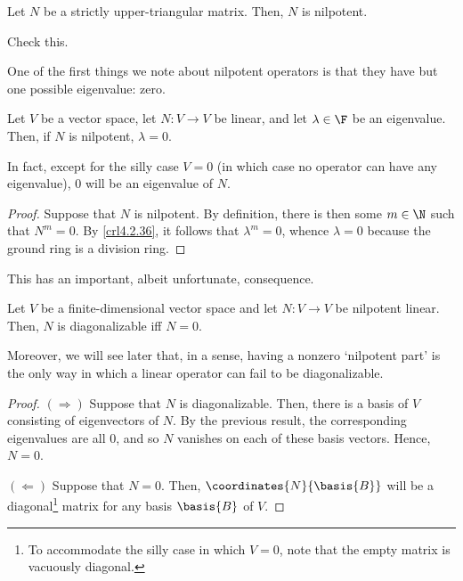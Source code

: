 \begin{exm}{}{}
	Let $N$ be a strictly upper-triangular matrix.  Then, $N$ is nilpotent.
	\begin{exr}[breakable=false]{}{}
		Check this.
	\end{exr}
\end{exm}

One of the first things we note about nilpotent operators is that they have but one possible eigenvalue:  zero.
\begin{prp}{}{}
	Let $V$ be a vector space, let $N\colon V\rightarrow V$ be linear, and let $\lambda \in \F$ be an eigenvalue.  Then, if $N$ is nilpotent, $\lambda =0$.
	\begin{rmk}
		In fact, except for the silly case $V=0$ (in which case no operator can have any eigenvalue), $0$ will be an eigenvalue of $N$.
	\end{rmk}
	\begin{proof}
		Suppose that $N$ is nilpotent.  By definition, there is then some $m\in \N$ such that $N^m=0$.  By \cref{crl4.2.36}, it follows that $\lambda ^m=0$, whence $\lambda =0$ because the ground ring is a division ring.
	\end{proof}
\end{prp}
This has an important, albeit unfortunate, consequence.
\begin{crl}{}{}
	Let $V$ be a finite-dimensional vector space and let $N\colon V\rightarrow V$ be nilpotent linear.  Then, $N$ is diagonalizable iff $N=0$.
	\begin{rmk}
		Moreover, we will see later that, in a sense, having a nonzero `nilpotent part' is the only way in which a linear operator can fail to be diagonalizable.
	\end{rmk}
	\begin{proof}
		$(\Rightarrow )$ Suppose that $N$ is diagonalizable.  Then, there is a basis of $V$ consisting of eigenvectors of $N$.  By the previous result, the corresponding eigenvalues are all $0$, and so $N$ vanishes on each of these basis vectors.  Hence, $N=0$.
		
		\blni
		$(\Leftarrow )$ Suppose that $N=0$.  Then, $\coordinates{N}{\basis{B}}$ will be a diagonal\footnote{To accommodate the silly case in which $V=0$, note that the empty matrix is vacuously diagonal.} matrix for any basis $\basis{B}$ of $V$.
	\end{proof}
\end{crl}

